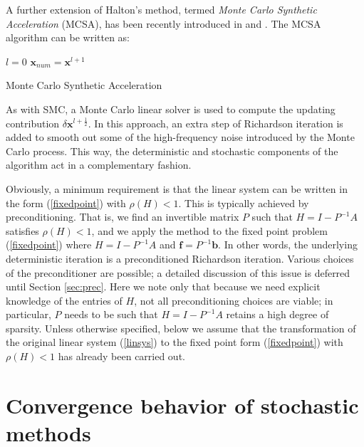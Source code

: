 \documentclass[times]{nlaauth}
\begin{document}
A further extension of Halton's method, termed
\textit{Monte Carlo Synthetic Acceleration} (MCSA), has been recently
introduced in \cite{ESW2013} and \cite{EMSH2014}.  The MCSA algorithm can be
written as:

\begin{algorithm}[H]
\LinesNumbered
 $l=0$\;
 $\mathbf{x}_{num}=\mathbf{x}^{l+1}$\;
 \caption{Monte Carlo Synthetic Acceleration}
\end{algorithm}

As with SMC, a Monte Carlo linear solver is used to compute the updating
contribution $\delta \mathbf{x}^{l+\frac{1}{2}}$.  In this approach, an
extra step of Richardson iteration is added to smooth out
some of the high-frequency noise introduced by the Monte Carlo process.
This way, the deterministic and stochastic components of the algorithm
act in a complementary fashion.

Obviously, a minimum requirement is that the linear system can be written
in the form (\ref{fixedpoint}) with $\rho(H) < 1$. This is typically achieved by
preconditioning. That is, we find an invertible matrix $P$ such that $H = I - P^{-1}A$
satisfies $\rho(H) < 1$, and we apply the method to the fixed point problem
(\ref{fixedpoint}) where $H = I - P^{-1}A$ and $\mathbf{f} = P^{-1}\mathbf{b}$. In
other words, the underlying deterministic iteration is a preconditioned
Richardson iteration. Various choices of the preconditioner are possible;
a detailed discussion of this issue is deferred until Section \ref{sec:prec}.
Here we note only that because we need explicit
knowledge of the entries of $H$, not all preconditioning choices are
viable; in particular, $P$ needs to be such that $H = I - P^{-1}A$ retains
a high degree of sparsity. Unless otherwise specified, below we
assume that the transformation of the original linear system (\ref{linsys})
to the fixed point form (\ref{fixedpoint}) with $\rho(H)<1$ has already
been carried out.

\section{Convergence behavior of stochastic methods}
\label{sec:convergence}
\end{document}

